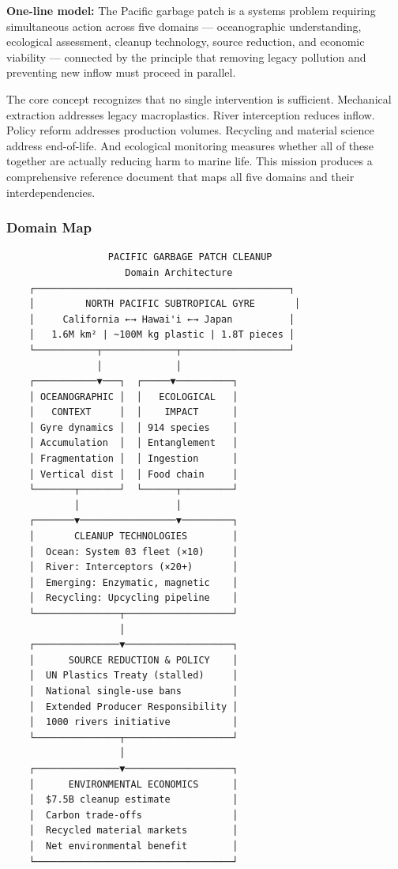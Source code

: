 \documentclass[11pt,letterpaper]{article}
\begin{document}
\textbf{One-line model:} The Pacific garbage patch is a systems problem requiring simultaneous action across five domains --- oceanographic understanding, ecological assessment, cleanup technology, source reduction, and economic viability --- connected by the principle that removing legacy pollution and preventing new inflow must proceed in parallel.

The core concept recognizes that no single intervention is sufficient. Mechanical extraction addresses legacy macroplastics. River interception reduces inflow. Policy reform addresses production volumes. Recycling and material science address end-of-life. And ecological monitoring measures whether all of these together are actually reducing harm to marine life. This mission produces a comprehensive reference document that maps all five domains and their interdependencies.

\subsubsection{Domain Map}

\begin{asciibox}
\begin{verbatim}
                  PACIFIC GARBAGE PATCH CLEANUP
                     Domain Architecture
    ┌─────────────────────────────────────────────┐
    │         NORTH PACIFIC SUBTROPICAL GYRE       │
    │     California ←→ Hawai'i ←→ Japan          │
    │   1.6M km² | ~100M kg plastic | 1.8T pieces │
    └───────────┬─────────────┬───────────────────┘
                │             │
    ┌───────────▼───┐  ┌─────▼──────────┐
    │ OCEANOGRAPHIC │  │   ECOLOGICAL   │
    │   CONTEXT     │  │    IMPACT      │
    │ Gyre dynamics │  │ 914 species    │
    │ Accumulation  │  │ Entanglement   │
    │ Fragmentation │  │ Ingestion      │
    │ Vertical dist │  │ Food chain     │
    └───────┬───────┘  └──────┬─────────┘
            │                 │
    ┌───────▼─────────────────▼─────────┐
    │       CLEANUP TECHNOLOGIES        │
    │  Ocean: System 03 fleet (×10)     │
    │  River: Interceptors (×20+)       │
    │  Emerging: Enzymatic, magnetic    │
    │  Recycling: Upcycling pipeline    │
    └───────────────┬───────────────────┘
                    │
    ┌───────────────▼───────────────────┐
    │      SOURCE REDUCTION & POLICY    │
    │  UN Plastics Treaty (stalled)     │
    │  National single-use bans         │
    │  Extended Producer Responsibility │
    │  1000 rivers initiative           │
    └───────────────┬───────────────────┘
                    │
    ┌───────────────▼───────────────────┐
    │      ENVIRONMENTAL ECONOMICS      │
    │  $7.5B cleanup estimate           │
    │  Carbon trade-offs                │
    │  Recycled material markets        │
    │  Net environmental benefit        │
    └───────────────────────────────────┘
\end{verbatim}
\end{asciibox}
\end{document}

